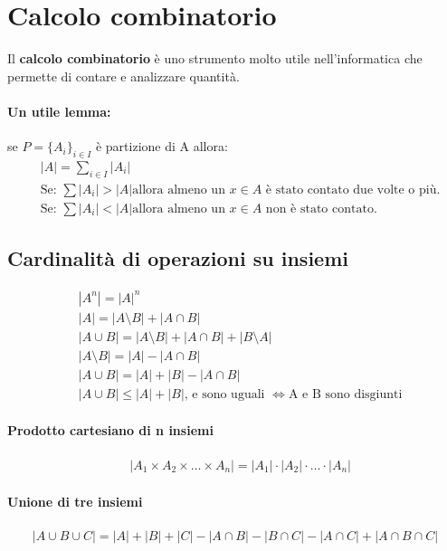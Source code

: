 \documentclass[a4paper,12pt]{article}
\let\oldsection\section
\renewcommand{\section}{\clearpage\oldsection}
\begin{document}
\section{Calcolo combinatorio}
Il \textbf{calcolo combinatorio} è uno strumento molto utile nell'informatica che permette di contare e analizzare quantità.
\paragraph{Un utile lemma:} se $P = \{A_i\}_{i \in I}$ è partizione di A allora:
\begin{align*}
    &|A| = \sum_{i \in I} |A_i| \\
    &\text{Se: } \sum |A_i| > |A| \text{allora almeno un } x \in A \text{ è stato contato due volte o più.}\\
    &\text{Se: } \sum |A_i| < |A| \text{allora almeno un } x \in A \text{ non è stato contato.}
\end{align*}

\subsection{Cardinalità di operazioni su insiemi}
\begin{align*}
    &|A^n| = |A|^n\\
    &|A| = |A\setminus B| + |A\cap B|\\
    &|A \cup B| = |A\setminus B| + |A \cap B| + |B \setminus A|\\
    &|A\setminus B| = |A| - |A \cap B|\\
    &|A \cup B| = |A| + |B| - |A\cap B|\\
    &|A \cup B| \leq |A| + |B| \text{, e sono uguali } \Longleftrightarrow \text{A e B sono disgiunti}
\end{align*}
\paragraph{Prodotto cartesiano di n insiemi}
\begin{align*}
    &|A_1\times A_2 \times \ldots \times A_n| = |A_1| \cdot |A_2| \cdot \ldots \cdot |A_n|
\end{align*}
\paragraph{Unione di tre insiemi}
\begin{align*}
    |A \cup B \cup C| = |A| + |B| + |C|- |A \cap B| - |B \cap C| - |A \cap C| + |A \cap B \cap C|
\end{align*}
\end{document}
